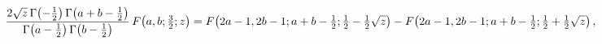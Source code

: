 \[\frac{2\sqrt{z}\mathop{\Gamma\/}\nolimits\!\left(-\tfrac{1}{2}\right)\mathop{%
\Gamma\/}\nolimits\!\left(a+b-\tfrac{1}{2}\right)}{\mathop{\Gamma\/}\nolimits%
\!\left(a-\tfrac{1}{2}\right)\mathop{\Gamma\/}\nolimits\!\left(b-\tfrac{1}{2}%
\right)}\mathop{F\/}\nolimits\!\left(a,b;\tfrac{3}{2};z\right)=\mathop{F\/}%
\nolimits\!\left(2a-1,2b-1;a+b-\tfrac{1}{2};\tfrac{1}{2}-\tfrac{1}{2}\sqrt{z}%
\right)-\mathop{F\/}\nolimits\!\left(2a-1,2b-1;a+b-\tfrac{1}{2};\tfrac{1}{2}+%
\tfrac{1}{2}\sqrt{z}\right),\]